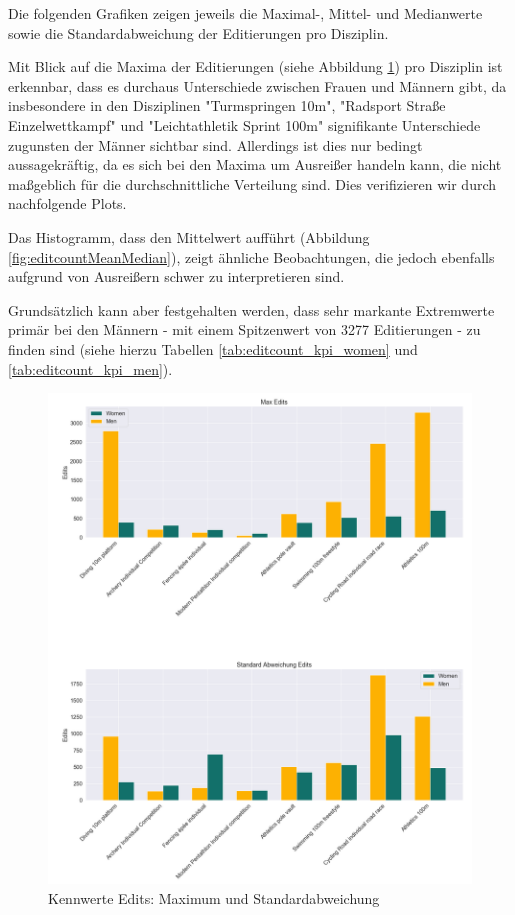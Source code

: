 \documentclass[11pt]{article}
\begin{document}
Die folgenden Grafiken zeigen jeweils die Maximal-, Mittel- und Medianwerte sowie die Standardabweichung der Editierungen pro Disziplin.

Mit Blick auf die Maxima der Editierungen (siehe Abbildung \ref{fig:editcountMaxStd}) pro Disziplin ist erkennbar, dass es durchaus Unterschiede zwischen Frauen und Männern gibt, da insbesondere in den Disziplinen "Turmspringen 10m", "Radsport Straße Einzelwettkampf" und "Leichtathletik Sprint 100m" signifikante Unterschiede zugunsten der Männer sichtbar sind. Allerdings ist dies nur bedingt aussagekräftig, da es sich bei den Maxima um Ausreißer handeln kann, die nicht maßgeblich für die durchschnittliche Verteilung sind. Dies verifizieren wir durch nachfolgende Plots.

Das Histogramm, dass den Mittelwert aufführt (Abbildung \ref{fig:editcountMeanMedian}), zeigt ähnliche Beobachtungen, die jedoch ebenfalls aufgrund von Ausreißern schwer zu interpretieren sind.

Grundsätzlich kann aber festgehalten werden, dass sehr markante Extremwerte primär bei den Männern - mit einem Spitzenwert von 3277 Editierungen - zu finden sind (siehe hierzu Tabellen \ref{tab:editcount_kpi_women} und \ref{tab:editcount_kpi_men}).

\begin{figure}
\includegraphics[width=1\textwidth]{figures/editcount_max_std.png}
\caption[Kennwerte Editierungen: Maximum und Standardabweichung]{Kennwerte Edits: Maximum und Standardabweichung}
\label{fig:editcountMaxStd}
\end{figure}
\end{document}
